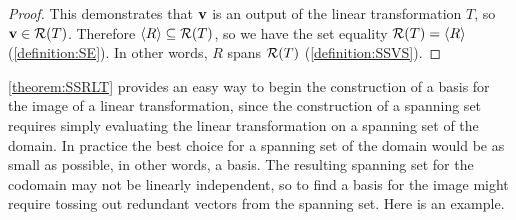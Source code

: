 \documentclass{ximera}
\begin{document}
\begin{theorem}
\begin{proof}
This demonstrates that $\mathbf{v}$ is an output of the linear transformation $T$, so $\mathbf{v}\in\mathcal{R}\!\left(T\right)$.  Therefore $\left\langle R\right\rangle\subseteq\mathcal{R}\!\left(T\right)$, so we have the set equality $\mathcal{R}\!\left(T\right)=\left\langle R\right\rangle$ (\ref{definition:SE}).  In other words, $R$ spans $\mathcal{R}\!\left(T\right)$ (\ref{definition:SSVS}).



\end{proof}
\end{theorem}

\ref{theorem:SSRLT} provides an easy way to begin the construction of a basis for the image of a linear transformation, since the construction of a spanning set requires simply evaluating the linear transformation on a spanning set of the domain.  In practice the best choice for a spanning set of the domain would be as small as possible, in other words, a basis.  The resulting spanning set for the codomain may not be linearly independent, so to find a basis for the image might require tossing out redundant vectors from the spanning set.  Here is an example.
\end{document}
